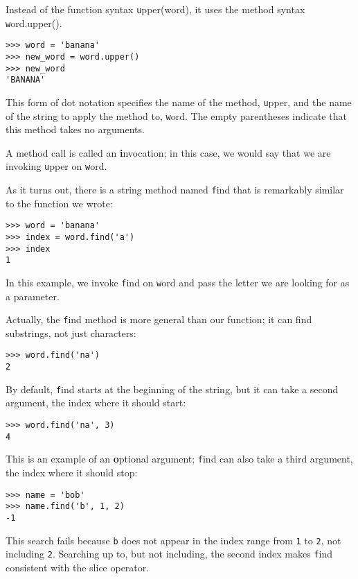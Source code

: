 \documentclass[
DIV=11,
fontsize=13,
twoside,
headinclude=false,
titlepage=firstiscover,
abstract=true,
headsepline=true,
footsepline=true,
chapterprefix=true, %
headings=big,
bibliography=totoc,%
captions=tableheading
]{scrbook}
\theoremstyle{definition}
\begin{document}
Instead of the function syntax {\texttt upper(word)}, it uses
the method syntax {\texttt word.upper()}.

\begin{lstlisting}
>>> word = 'banana'
>>> new_word = word.upper()
>>> new_word
'BANANA'
\end{lstlisting}
%
This form of dot notation specifies the name of the method, {\texttt
upper}, and the name of the string to apply the method to, {\texttt
word}.  The empty parentheses indicate that this method takes no
arguments.

A method call is called an {\textbf invocation}; in this case, we would
say that we are invoking {\texttt upper} on {\texttt word}.

As it turns out, there is a string method named {\texttt find} that
is remarkably similar to the function we wrote:

\begin{lstlisting}
>>> word = 'banana'
>>> index = word.find('a')
>>> index
1
\end{lstlisting}
%
In this example, we invoke {\texttt find} on {\texttt word} and pass
the letter we are looking for as a parameter.

Actually, the {\texttt find} method is more general than our function;
it can find substrings, not just characters:

\begin{lstlisting}
>>> word.find('na')
2
\end{lstlisting}
%
By default, {\texttt find} starts at the beginning of the string, but
it can take a second argument, the index where it should start:

\begin{lstlisting}
>>> word.find('na', 3)
4
\end{lstlisting}
%
This is an example of an {\textbf optional argument};
{\texttt find} can
also take a third argument, the index where it should stop:

\begin{lstlisting}
>>> name = 'bob'
>>> name.find('b', 1, 2)
-1
\end{lstlisting}
%
This search fails because {\texttt b} does not
appear in the index range from {\texttt 1} to {\texttt 2}, not including {\texttt
2}.  Searching up to, but not including, the second index makes
{\texttt find} consistent with the slice operator.
\end{document}
